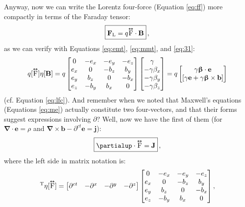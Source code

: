 \documentclass[12pt]{article}
\renewcommand{\vv}[1]{\mathbf{#1}}
\newcommand{\vvbeta}{\bm{\upbeta}}
\newcommand{\del}{\boldsymbol{\nabla}}
\newcommand{\capdy}[1]{ \overset{ \text{\tiny$\bm\leftrightarrow$} }{\vphantom{\text{\small{A}}}\smash{#1}} }
\begin{document}
Anyway, now we can write the Lorentz four-force (Equation \ref{eq:ff}) more compactly in terms of the Faraday tensor:
\begin{equation}\label{eq:lfffd}
\boxed{ \vphantom{A_{A_A}} \vv F_{\mathrm{L}} = q \capdy{\mathrm{F}} \cdot \vv B } \, ,
\end{equation}
as we can verify with Equations \ref{eq:emt}, \ref{eq:mmt}, and \ref{eq:31}:
\begin{equation*}
q [\capdy{\mathrm{F}}] \eta [\vv B]
=
q
\begin{bmatrix}
0 & -e_x & -e_y & -e_z \\
e_x & 0 & -b_z & b_y \\
e_y & b_z & 0 & -b_x \\
e_z & -b_y & b_x & 0
\end{bmatrix}
\begin{bmatrix}
\gamma \\
- \gamma \beta_x \\
- \gamma \beta_y \\
- \gamma \beta_z
\end{bmatrix}
=
q
\begin{bmatrix}
\gamma \vvbeta \cdot \vv e \\
[ \gamma \vv e + \gamma \vvbeta \times \vv b ]
\end{bmatrix}
\end{equation*}
(cf. Equation \ref{eq:lfc}). And remember when we noted that Maxwell's equations (Equations \ref{eq:me}) actually constitute two four-vectors, and that their forms suggest expressions involving $\partialup$? Well, now we have the first of them (for $\del \cdot \vv e = \rho$ and $ \del \times \vv b - \partial^{ct} \vv e = \vv j$):
\begin{equation}\label{eq:ime}
\boxed{ \vphantom{A_{A_A}} \partialup \cdot \capdy{\mathrm{F}} = \vv J } \, ,
\end{equation}
where the left side in matrix notation is:
\begin{equation*}
[\partialup]^{\mathrm{T}} \eta [\capdy{\mathrm{F}}]
=
\begin{bmatrix}
\partial^{ct} & - \partial^x & - \partial^y & - \partial^z
\end{bmatrix}
\begin{bmatrix}
0 & -e_x & -e_y & -e_z \\
e_x & 0 & -b_z & b_y \\
e_y & b_z & 0 & -b_x \\
e_z & -b_y & b_x & 0
\end{bmatrix} ,
\end{equation*}
\end{document}
